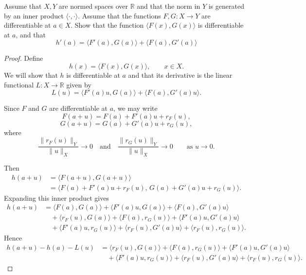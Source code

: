 \begin{prob}
    Assume that $X,Y$ are normed spaces over 
    $\mathbb R$ and that the norm in $Y$ is generated 
    by an inner product $\langle \cdot, \cdot \rangle$. 
    Assume that the functions $F, G : X \to Y$ are 
    differentiable at $a \in X$. Show that the function 
    $\langle F(x), G(x) \rangle$ is differentiable at 
    $a$, and that 
    \[
        h'(a) = \langle F'(a), G(a)\rangle + 
        \langle F(a), G'(a)\rangle
    \]
\end{prob}
\begin{proof}
    Define
    \[
        h(x) = \langle F(x), G(x)\rangle, \qquad x \in X.
    \]
    We will show that $h$ is differentiable at $a$ and that 
    its derivative is
    the linear functional $L : X \to \mathbb R$ given by
    \[
        L(u) = \langle F'(a)u, G(a)\rangle + \langle F(a), 
        G'(a)u\rangle.
    \]

    Since $F$ and $G$ are differentiable at $a$, we may write
    \[
        F(a+u) = F(a) + F'(a)u + r_F(u),
    \]
    \[
        G(a+u) = G(a) + G'(a)u + r_G(u),
    \]
    where
    \[
        \frac{\|r_F(u)\|_Y}{\|u\|_X} \to 0
        \quad\text{and}\quad
        \frac{\|r_G(u)\|_Y}{\|u\|_X} \to 0
        \qquad\text{as } u\to 0.
    \]

    Then
    \begin{align*}
        h(a+u)
        &= \langle F(a+u), G(a+u)\rangle \\
        &= \langle F(a)+F'(a)u+r_F(u),\,
                 G(a)+G'(a)u+r_G(u)\rangle.
    \end{align*}
    Expanding this inner product gives
    \begin{align*}
        h(a+u)
        &= \langle F(a),G(a)\rangle
         + \langle F'(a)u, G(a)\rangle
         + \langle F(a), G'(a)u\rangle \\
        &\quad
         + \langle r_F(u), G(a)\rangle
         + \langle F(a), r_G(u)\rangle
         + \langle F'(a)u, G'(a)u\rangle \\
        &\quad
         + \langle F'(a)u, r_G(u)\rangle
         + \langle r_F(u), G'(a)u\rangle
         + \langle r_F(u), r_G(u)\rangle.
    \end{align*}
    Hence
    \begin{align*}
        h(a+u)-h(a)-L(u)
        &= \langle r_F(u), G(a)\rangle
         + \langle F(a), r_G(u)\rangle
         + \langle F'(a)u, G'(a)u\rangle \\
        &\quad
         + \langle F'(a)u, r_G(u)\rangle
         + \langle r_F(u), G'(a)u\rangle
         + \langle r_F(u), r_G(u)\rangle.
    \end{align*}


\end{proof}
